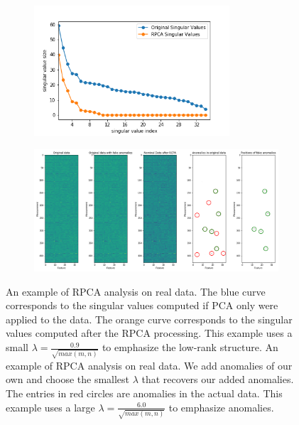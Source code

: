 \documentclass[conference]{IEEEtran}
\begin{document}
\begin{figure}
\begin{subfigure}{.5\textwidth}
    \centering
    \includegraphics[width=0.8\textwidth]{images/new_7-26-2020/real_data_svd.png}
    \label{fig:real_data_rank}
\end{subfigure}
\begin{subfigure}{.5\textwidth}
    \centering
    \includegraphics[width=1.0\textwidth]{images/new_7-26-2020/real_data.png}
    \label{fig:real_data_anomalie}
\end{subfigure}
    \caption{An example of RPCA analysis on real data.  The blue curve corresponds to the singular values computed if PCA only were applied to the data.  The orange curve corresponds to the singular values computed after the RPCA processing.  This example uses a small $\lambda=\frac{0.9}{\sqrt{max(m,n)}}$ to emphasize the low-rank structure. An example of RPCA analysis on real data.   We add anomalies of our own and choose the smallest $\lambda$ that recovers our added anomalies.  The entries in red circles are anomalies in the actual data. This example uses a large $\lambda=\frac{6.0}{\sqrt{max(m,n)}}$ to emphasize anomalies. }
\end{figure}
\end{document}
